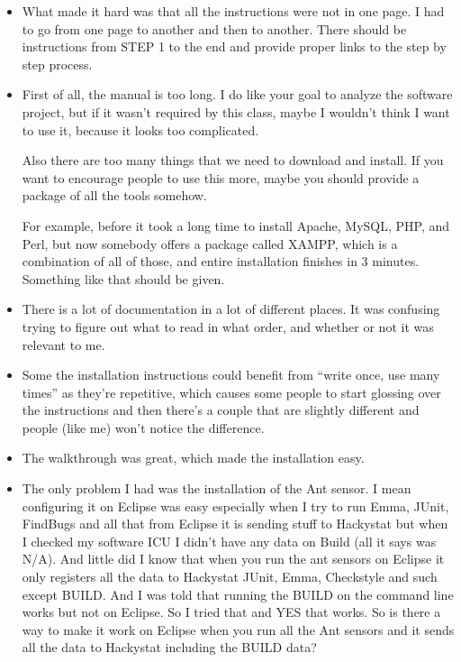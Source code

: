 \begin{itemize}
\item What made it hard was that all the instructions were not in one page.  I had to go from one page to another and then to another.  There should be instructions from STEP 1 to the end and provide proper links to the step by step process.

\item First of all, the manual is too long. I do like your goal to analyze the software project, but if it wasn't required by this class, maybe I wouldn't think I want to use it, because it looks too complicated. 

Also there are too many things that we need to download and install. If you want to encourage people to use this more, maybe you should provide a package of all the tools somehow. 

For example, before it took a long time to install Apache, MySQL, PHP, and Perl, but now somebody offers a package called XAMPP, which is a combination of all of those, and entire installation finishes in 3 minutes. Something like that should be given. 

\item There is a lot of documentation in a lot of different places.  It was confusing trying to figure out what to read in what order, and whether or not it was relevant to me.

\item Some the installation instructions could benefit from ``write once, use many times'' as they're repetitive, which causes some people to start glossing over the instructions and then there's a couple that are slightly different and people (like me) won't notice the difference.

\item The walkthrough was great, which made the installation easy.

\item The only problem I had was the installation of the Ant sensor. I mean configuring it on Eclipse was easy especially when I try to run Emma, JUnit, FindBugs and all that from Eclipse it is sending stuff to Hackystat but when I checked my software ICU I didn't have any data on Build (all it says was N/A). And little did I know that when you run the ant sensors on Eclipse it only registers all the data to Hackystat JUnit, Emma, Checkstyle and such except BUILD. And I was told  that running the BUILD on the command line works but not on Eclipse. So I tried that and YES that works. So is there a way to make it work on Eclipse when you run all the Ant sensors and it sends all the data to Hackystat including the BUILD data?


\end{itemize}
